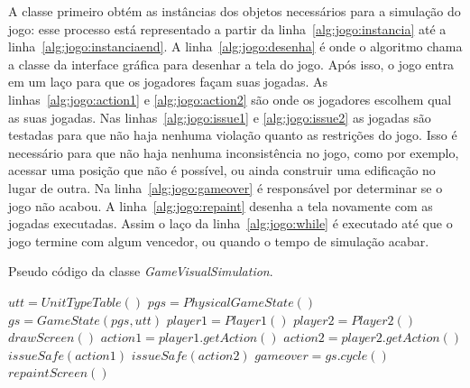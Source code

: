 A classe primeiro obtém as instâncias dos objetos necessários para a simulação do jogo: esse processo está representado a partir da linha~\ref{alg:jogo:instancia} até a linha~\ref{alg:jogo:instanciaend}.
A linha~\ref{alg:jogo:desenha} é onde o algoritmo chama a classe da interface gráfica para desenhar a tela do jogo.
Após isso, o jogo entra em um laço para que os jogadores façam suas jogadas. As linhas~\ref{alg:jogo:action1} e \ref{alg:jogo:action2} são onde os jogadores escolhem qual as suas jogadas.
Nas linhas~\ref{alg:jogo:issue1} e \ref{alg:jogo:issue2} as jogadas são testadas para que não haja nenhuma violação quanto as restrições do jogo.
Isso é necessário para que não haja nenhuma inconsistência no jogo, como por exemplo, acessar uma posição que não é possível, ou ainda construir uma edificação no lugar de outra.
Na linha~\ref{alg:jogo:gameover} é responsável por determinar se o jogo não acabou.
A linha~\ref{alg:jogo:repaint} desenha a tela novamente com as jogadas executadas.
Assim o laço da linha~\ref{alg:jogo:while} é executado até que o jogo termine com algum vencedor, ou quando o tempo de simulação acabar.

\begin{algorithm}
	\caption{Pseudo código da classe \textit{GameVisualSimulation}.}
	\label{alg:jogo}
	\begin{algorithmic}[1]		
		\State $utt = UnitTypeTable()$ \label{alg:jogo:instancia}
		\State $pgs = PhysicalGameState()$
		\State $gs = GameState(pgs, utt)$
		\State $player1 = Player1()$
		\State $player2 = Player2()$ \label{alg:jogo:instanciaend}
		\State $drawScreen()$  \label{alg:jogo:desenha}
		 \label{alg:jogo:while}
			\State $action1 = player1.getAction()$ \label{alg:jogo:action1}
			\State $action2 = player2.getAction()$ \label{alg:jogo:action2}
			\State $issueSafe(action1)$ \label{alg:jogo:issue1}
			\State $issueSafe(action2)$ \label{alg:jogo:issue2}
			\State $gameover = gs.cycle()$ \label{alg:jogo:gameover} 
			\State $repaintScreen()$ \label{alg:jogo:repaint}
		\EndWhile
		\EndFunction
	\end{algorithmic}
\end{algorithm}

